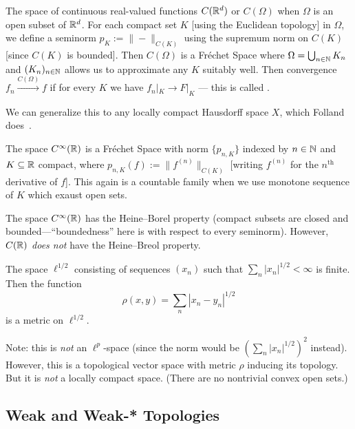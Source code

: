 \begin{example}
The space of continuous real-valued functions $C(\mathbb{R}^{d})$ or
$C(\Omega)$ when $\Omega$ is an open subset of $\mathbb{R}^{d}$. For each
compact set $K$ [using the Euclidean topology] in $\Omega$, we define
a seminorm $p_{K} := \|-\|_{C(K)}$ using the supremum norm on $C(K)$
[since $C(K)$ is bounded]. Then $C(\Omega)$ is a Fr\'{e}chet Space
where $\Omega=\bigcup_{n\in\mathbb{N}}K_{n}$ and $(K_{n})_{n\in\mathbb{N}}$ allows
us to approximate any $K$ suitably well. Then convergence
$f_{n}\xrightarrow{C(\Omega)}f$ if for every $K$ we have
$f_{n}|_{K}\to F|_{K}$ --- this is called .

We can generalize this to any locally compact Hausdorff space $X$,
which Folland does~\cite[pp.167--168]{folland1999real}.
\end{example}

\begin{example}
The space $C^{\infty}(\mathbb{R})$ is a Fr\'{e}chet Space with norm
$\{p_{n,K}\}$ indexed by $n\in\mathbb{N}$ and $K\subseteq\mathbb{R}$ compact, where
$p_{n,K}(f):=\|f^{(n)}\|_{C(K)}$ [writing $f^{(n)}$ for the
  $n^{\text{th}}$ derivative of $f$].
This again is a countable family when we use monotone sequence of $K$
which exaust open sets.
\end{example}

\begin{xca}
The space $C^{\infty}(\mathbb{R})$ has the Heine--Borel property (compact
subsets are closed and bounded---``boundedness'' here is with respect
to every seminorm). However, $C(\mathbb{R})$ \emph{does not} have the
Heine--Breol property.
\end{xca}

\begin{example}
The space $\ell^{1/2}$ consisting of sequences $(x_{n})$ such that
$\sum_{n}|x_{n}|^{1/2}<\infty$ is finite. Then the function
\begin{equation}
\rho(x,y)=\sum_{n}|x_{n}-y_{n}|^{1/2}
\end{equation}
is a metric on $\ell^{1/2}$.

Note: this is \emph{not} an $\ell^{p}$-space (since the norm would be
$(\sum_{n}|x_{n}|^{1/2})^{2}$ instead). However, this is a topological
vector space with metric $\rho$ inducing its topology. But it is
\emph{not} a locally compact space. (There are no nontrivial convex
open sets.)
\end{example}

\subsection{Weak and Weak-* Topologies}

